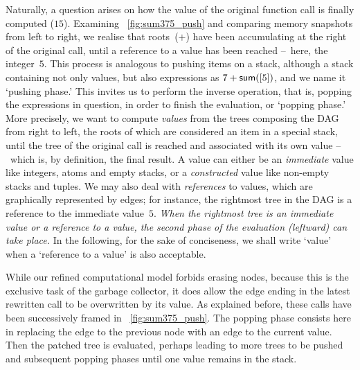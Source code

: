 Naturally, a question arises on how the value of the original function
call is finally computed (\(15\)). Examining
\fig~\ref{fig:sum375_push} and comparing memory snapshots from left to
right, we realise that roots~(\(+\)) have been accumulating at the
right of the original call, until a reference to a value has been
reached --~here, the integer~\(5\). This process is analogous to
pushing items on a stack, although a stack containing not only values,
but also expressions as \(7 + \textsf{sum}([5])\), and we name it
`pushing phase.' This invites us to perform the inverse operation,
that is, popping the expressions in question, in order to finish the
evaluation, or `popping phase.'  More precisely, we want to compute
\emph{values} from the trees composing the DAG from right to left, the
roots of which are considered an item in a special stack, until the
tree of the original call is reached and associated with its own value
--~which is, by definition, the final result. A value can either be an
\emph{immediate} value like integers, atoms and empty stacks, or a
\emph{constructed} value like non\hyp{}empty stacks and tuples. We may
also deal with \emph{references} to values, which are graphically
represented by edges; for instance, the rightmost tree in the DAG is a
reference to the immediate value~\(5\). \emph{When the rightmost tree
  is an immediate value or a reference to a value, the second phase of
  the evaluation (leftward) can take place.} In the following, for the
sake of conciseness, we shall write `value' when a `reference to a
value' is also acceptable.

While our refined computational model forbids erasing nodes, because this is the exclusive task of the garbage collector, it does allow the edge ending in the latest rewritten call to be overwritten by its value. As explained before, these calls have been successively framed in \fig~\vref{fig:sum375_push}. The popping phase consists here in replacing the edge to the previous node  with an edge to the current value. Then the patched tree is evaluated, perhaps leading to more trees to be pushed and subsequent popping phases until one value remains in the stack.

